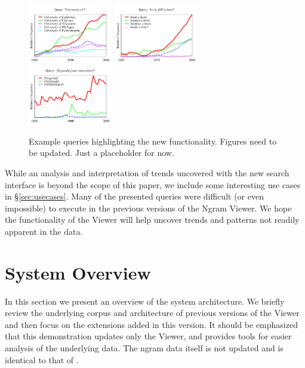 \documentclass[11pt]{article}
\begin{document}
\begin{figure}
\centering
\hspace*{-0.5cm}
\includegraphics[width=0.33\textwidth]{graphs/university}
\hspace*{0.1cm}
\includegraphics[width=0.33\textwidth]{graphs/book}
\hspace*{0.1cm}
\includegraphics[width=0.33\textwidth]{graphs/fitzgerald}
\hspace*{-0.5cm}
\vspace*{-0.25cm}\caption{\label{fig:examples}
Example queries highlighting the new functionality. Figures need to be updated. Just a placeholder for now.}
\end{figure}


While an analysis and interpretation of trends uncovered with the new search interface is beyond the scope of this paper, we include some interesting use cases in \S\ref{sec:usecases}. Many of the presented queries were difficult (or even impossible) to execute in the previous versions of the Ngram Viewer. We hope the functionality of the Viewer will help uncover trends and patterns not readily apparent in the data.


\section{System Overview}
\label{sec:overview}

In this section we present an overview of the system architecture. We briefly review the underlying corpus and architecture of previous versions of the Viewer \cite{culturomics,lin2012syntactic} and then focus on the extensions added in this version. It should be emphasized that this demonstration updates only the Viewer, and provides tools for easier analysis of the underlying data. The ngram data itself is not updated and is identical to that of .
\end{document}
